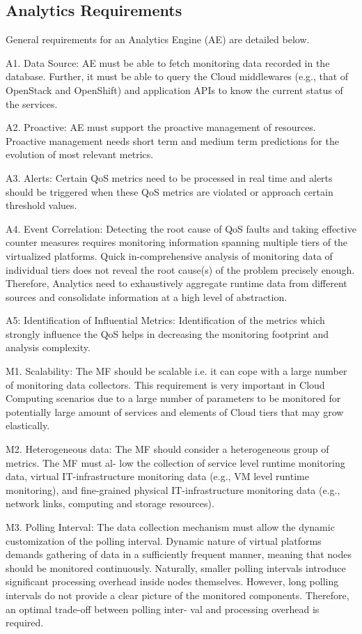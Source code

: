 \subsection{Analytics Requirements}
General requirements for an Analytics Engine (AE) are detailed below. 

A1. Data Source: AE must be able to fetch monitoring data recorded in the database. Further, it must be able to query the Cloud middlewares (e.g., that of OpenStack and OpenShift) and application APIs to know the current status of the services. 

A2. Proactive: AE must support the proactive management of resources. Proactive management needs short term and medium term predictions for the evolution of most relevant metrics. 

A3. Alerts: Certain QoS metrics need to be processed in real time and alerts should be triggered when these QoS metrics are violated or approach certain threshold values. 

A4. Event Correlation: Detecting the root cause of QoS faults and taking effective counter measures requires monitoring information spanning multiple tiers of the virtualized platforms. Quick in-comprehensive analysis of monitoring data of individual tiers does not reveal the root cause(s) of the problem precisely enough. Therefore, Analytics need to exhaustively aggregate runtime data from different sources and consolidate information at a high level of abstraction. 

A5: Identification of Influential Metrics: Identification of the metrics which strongly influence the QoS helps in decreasing the monitoring footprint and analysis complexity.

M1. Scalability: The MF should be scalable i.e. it can cope with a large number of monitoring data collectors. This requirement is very important in Cloud Computing scenarios due to a large number of parameters to be monitored for potentially large amount of services and elements of Cloud tiers that may grow elastically. 

M2. Heterogeneous data: The MF should consider a heterogeneous group of metrics. The MF must al- low the collection of service level runtime monitoring data, virtual IT-infrastructure monitoring data (e.g., VM level runtime monitoring), and fine-grained physical IT-infrastructure monitoring data (e.g., network links, computing and storage resources). 

M3. Polling Interval: The data collection mechanism must allow the dynamic customization of the polling interval. Dynamic nature of virtual platforms demands gathering of data in a sufficiently frequent manner, meaning that nodes should be monitored continuously. Naturally, smaller polling intervals introduce significant processing overhead inside nodes themselves. However, long polling intervals do not provide a clear picture of the monitored components. Therefore, an optimal trade-off between polling inter- val and processing overhead is required. 

